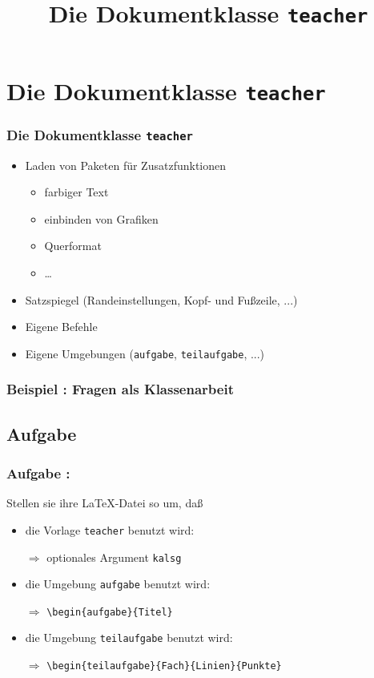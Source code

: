 \documentclass{beamer}
\newcounter{aufgabe}
\newcounter{beispiel}
\begin{document}
\section{Die Dokumentklasse \texttt{teacher}}

\title{Die Dokumentklasse \texttt{teacher}}
\author{}
\date{}
\frame{\titlepage}


\begin{frame}
  \frametitle{Die Dokumentklasse \texttt{teacher}}
  \begin{itemize}
  \item<1-> Laden von Paketen für Zusatzfunktionen
    \begin{itemize}
    \item<1-> farbiger Text
    \item<1-> einbinden von Grafiken
    \item<1-> Querformat
    \item<1-> \ldots
    \end{itemize}
  \item<2-> Satzspiegel (Randeinstellungen, Kopf- und Fußzeile, ...)
  \item<3-> Eigene Befehle
  \item<4-> Eigene Umgebungen (\texttt{aufgabe}, \texttt{teilaufgabe}, ...)
  \end{itemize}

\end{frame}


\begin{frame}[fragile]
  \frametitle{Beispiel \thebeispiel : Fragen als Klassenarbeit}


\end{frame}




\subsection{Aufgabe \theaufgabe}

\begin{frame}
  \frametitle{Aufgabe \theaufgabe:}

 Stellen sie ihre  \LaTeX -Datei so um, daß

  \begin{itemize}
  \item<1-> die Vorlage \texttt{teacher} benutzt wird:

   $\Longrightarrow$ optionales Argument \texttt{kalsg}
  \item<1-> die Umgebung \texttt{aufgabe} benutzt wird:

   $\Longrightarrow$ \texttt{\textbackslash begin\{aufgabe\}\{Titel\}}
  \item<1-> die Umgebung \texttt{teilaufgabe} benutzt wird:

   $\Longrightarrow$ \texttt{\textbackslash begin\{teilaufgabe\}\{Fach\}\{Linien\}\{Punkte\}}
  \end{itemize}
\end{frame}
\end{document}
